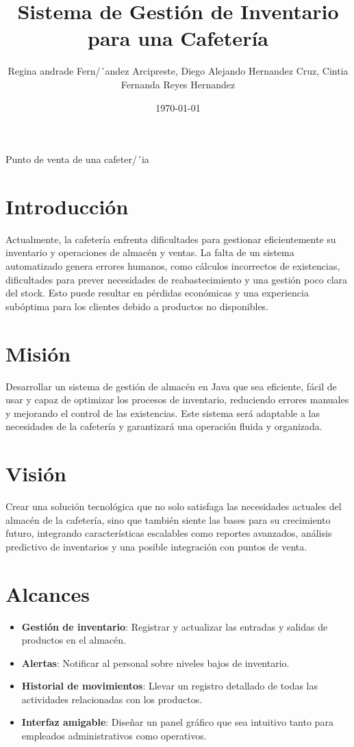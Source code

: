 \documentclass{report}
\title{Sistema de Gestión de Inventario para una Cafetería}
\author{Regina andrade Fern/´andez Arcipreste, Diego Alejando Hern\´andez Cruz, Cintia Fernanda Reyes Hern\´andez  }
\date{\today}
\begin{document}
\begin{center}

Punto de venta de una cafeter/´ia

\end{center}



\section{Introducción}
Actualmente, la cafetería enfrenta dificultades para gestionar eficientemente su inventario y operaciones de almacén y ventas. La falta de un sistema automatizado genera errores humanos, como cálculos incorrectos de existencias, dificultades para prever necesidades de reabastecimiento y una gestión poco clara del stock. Esto puede resultar en pérdidas económicas y una experiencia subóptima para los clientes debido a productos no disponibles.

\section{Misión}
Desarrollar un sistema de gestión de almacén en Java que sea eficiente, fácil de usar y capaz de optimizar los procesos de inventario, reduciendo errores manuales y mejorando el control de las existencias. Este sistema será adaptable a las necesidades de la cafetería y garantizará una operación fluida y organizada.

\section{Visión}
Crear una solución tecnológica que no solo satisfaga las necesidades actuales del almacén de la cafetería, sino que también siente las bases para su crecimiento futuro, integrando características escalables como reportes avanzados, análisis predictivo de inventarios y una posible integración con puntos de venta.

\section{Alcances}
\begin{itemize}
\item \textbf{Gestión de inventario}: Registrar y actualizar las entradas y salidas de productos en el almacén.
\item \textbf{Alertas}: Notificar al personal sobre niveles bajos de inventario.
\item \textbf{Historial de movimientos}: Llevar un registro detallado de todas las actividades relacionadas con los productos.
\item \textbf{Interfaz amigable}: Diseñar un panel gráfico que sea intuitivo tanto para empleados administrativos como operativos.
\end{itemize}
\end{document}
